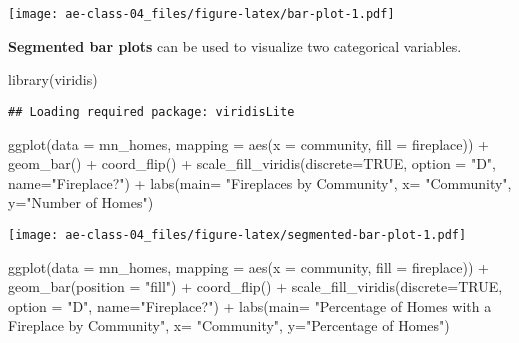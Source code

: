 \documentclass[
]{article}
\newenvironment{Shaded}{\begin{snugshade}}{\end{snugshade}}
\newcommand{\AttributeTok}[1]{\textcolor[rgb]{0.77,0.63,0.00}{#1}}
\newcommand{\ConstantTok}[1]{\textcolor[rgb]{0.00,0.00,0.00}{#1}}
\newcommand{\FunctionTok}[1]{\textcolor[rgb]{0.00,0.00,0.00}{#1}}
\newcommand{\NormalTok}[1]{#1}
\newcommand{\SpecialCharTok}[1]{\textcolor[rgb]{0.00,0.00,0.00}{#1}}
\newcommand{\StringTok}[1]{\textcolor[rgb]{0.31,0.60,0.02}{#1}}
\begin{document}
\texttt{[image: ae-class-04\_files/figure-latex/bar-plot-1.pdf]}

\textbf{Segmented bar plots} can be used to visualize two categorical
variables.

\begin{Shaded}
\begin{Highlighting}[]
\FunctionTok{library}\NormalTok{(viridis)}
\end{Highlighting}
\end{Shaded}

\begin{verbatim}
## Loading required package: viridisLite
\end{verbatim}

\begin{Shaded}
\begin{Highlighting}[]
\FunctionTok{ggplot}\NormalTok{(}\AttributeTok{data =}\NormalTok{ mn\_homes, }\AttributeTok{mapping =} \FunctionTok{aes}\NormalTok{(}\AttributeTok{x =}\NormalTok{ community, }\AttributeTok{fill =}\NormalTok{ fireplace)) }\SpecialCharTok{+} 
  \FunctionTok{geom\_bar}\NormalTok{() }\SpecialCharTok{+}
  \FunctionTok{coord\_flip}\NormalTok{() }\SpecialCharTok{+} 
  \FunctionTok{scale\_fill\_viridis}\NormalTok{(}\AttributeTok{discrete=}\ConstantTok{TRUE}\NormalTok{, }\AttributeTok{option =} \StringTok{"D"}\NormalTok{, }\AttributeTok{name=}\StringTok{"Fireplace?"}\NormalTok{) }\SpecialCharTok{+}
  \FunctionTok{labs}\NormalTok{(}\AttributeTok{main=} \StringTok{"Fireplaces by Community"}\NormalTok{, }\AttributeTok{x=} \StringTok{"Community"}\NormalTok{, }\AttributeTok{y=}\StringTok{"Number of Homes"}\NormalTok{)}
\end{Highlighting}
\end{Shaded}

\texttt{[image: ae-class-04\_files/figure-latex/segmented-bar-plot-1.pdf]}

\begin{Shaded}
\begin{Highlighting}[]
\FunctionTok{ggplot}\NormalTok{(}\AttributeTok{data =}\NormalTok{ mn\_homes, }\AttributeTok{mapping =} \FunctionTok{aes}\NormalTok{(}\AttributeTok{x =}\NormalTok{ community, }\AttributeTok{fill =}\NormalTok{ fireplace)) }\SpecialCharTok{+} 
  \FunctionTok{geom\_bar}\NormalTok{(}\AttributeTok{position =} \StringTok{"fill"}\NormalTok{) }\SpecialCharTok{+} \FunctionTok{coord\_flip}\NormalTok{() }\SpecialCharTok{+} 
  \FunctionTok{scale\_fill\_viridis}\NormalTok{(}\AttributeTok{discrete=}\ConstantTok{TRUE}\NormalTok{, }\AttributeTok{option =} \StringTok{"D"}\NormalTok{, }\AttributeTok{name=}\StringTok{"Fireplace?"}\NormalTok{) }\SpecialCharTok{+}
  \FunctionTok{labs}\NormalTok{(}\AttributeTok{main=} \StringTok{"Percentage of Homes with a Fireplace by Community"}\NormalTok{, }\AttributeTok{x=}
  \StringTok{"Community"}\NormalTok{, }\AttributeTok{y=}\StringTok{"Percentage of Homes"}\NormalTok{)}
\end{Highlighting}
\end{Shaded}
\end{document}
